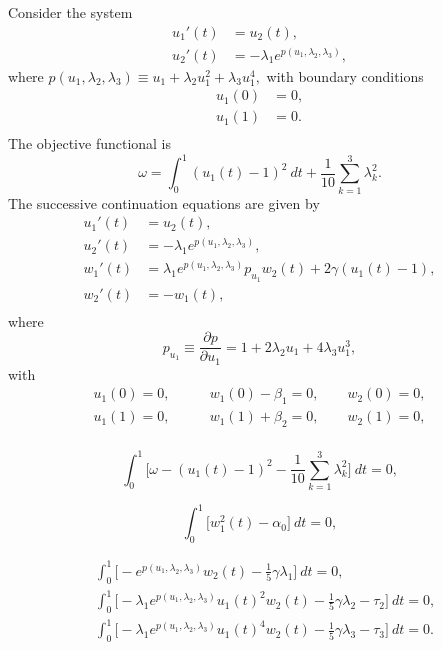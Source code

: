 \documentclass[12pt]{report}
\begin{document}
Consider the system
\begin{equation} \begin{array}{cl}
  u_1'(t) & = u_2(t), \\
  u_2'(t) &=
  -\lambda_1 e^{p(u_1,\lambda_2,\lambda_3)},
\end{array} \end{equation}
where
$ p(u_1,\lambda_2,\lambda_3) \equiv
  u_1 + \lambda_2 u_1^{2} + \lambda_3 u_1^{4},$
with boundary conditions
\begin{equation} \begin{array}{cl}
  u_1(0) &= 0, \\
  u_1(1) &= 0. \\
\end{array} \end{equation}
The objective functional is
$$ \omega = \int_0^{1} (u_1(t)-1)^{2}~ dt
  +  \frac{1}{10} \sum_{k=1}^{3} \lambda_{k}^{2}.  $$
The  successive continuation equations are given by
\begin{equation} \begin{array}{cl}
  u_1'(t) &= u_2(t), \\
  u_2'(t) &=
  -\lambda_1 e^{p(u_1,\lambda_2,\lambda_3)}, \\
  w_1'(t) &=
  \lambda_1 e^{p(u_1,\lambda_2,\lambda_3)} p_{u_1} w_2(t)
  + 2 \gamma(u_1(t)-1), \\
  w_2'(t) &= -w_1(t), \\
\end{array} \end{equation}
where
$$ p_{u_1} \equiv
  \frac{{\partial p} }{ {\partial u_1}} =
  1 + 2\lambda_2 u_1 + 4\lambda_3 u_1^{3},$$
with 
\begin{equation} \begin{array}{cl}
  u_1(0) = 0,\qquad  &w_1(0) - \beta_1 = 0,\qquad  w_2(0) = 0, \\
  u_1(1) = 0,\qquad  &w_1(1) + \beta_2 = 0,\qquad  w_2(1) = 0, \\\end{array} \end{equation}

$$ \int_0^{1} \bigl[ \omega - (u_1(t)-1)^{2}
  - \frac{1}{10} \sum_{k=1}^{3} \lambda_{k}^{2} \bigr]~ dt = 0, $$

$$ \int_0^{1} \bigl[w_1^{2}(t) - \alpha_0 \bigr]~ dt = 0, $$
 
\begin{equation} \begin{array}{cl}
  &\int_0^{1} \bigl[
  -e^{p(u_1,\lambda_2,\lambda_3)} w_2(t)
  - \frac{1}{5}\gamma \lambda_1
  \bigr]~ dt = 0, \\
  &\int_0^{1} \bigl[
  -\lambda_1 e^{p(u_1,\lambda_2,\lambda_3)} u_1(t)^{2} w_2(t)
  - \frac{1}{5}\gamma \lambda_2
  - \tau_2  \bigr]~ dt = 0, \\
  &\int_0^{1} \bigl[
  -\lambda_1 e^{p(u_1,\lambda_2,\lambda_3)} u_1(t)^{4} w_2(t)
  - \frac{1}{5}\gamma \lambda_3
  - \tau_3 \bigr]~ dt = 0. \\\end{array} \end{equation}
\end{document}
